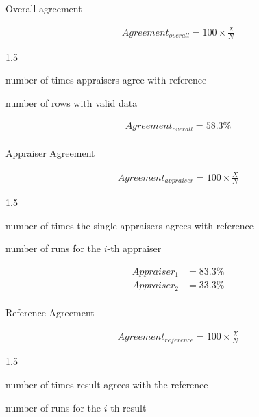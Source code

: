 \documentclass[
  a4paper,
]{scrbook}
\makeatletter
\let\oldparagraph\paragraph
\renewcommand{\paragraph}{
    \@ifstar
      \xxxParagraphStar
      \xxxParagraphNoStar
  }
\newcommand{\xxxParagraphStar}[1]{\oldparagraph*{#1}\mbox{}}
\newcommand{\xxxParagraphNoStar}[1]{\oldparagraph{#1}\mbox{}}
\providecommand{\tightlist}{%
  \setlength{\itemsep}{0pt}\setlength{\parskip}{0pt}}\usepackage{longtable,booktabs,array}
\let\olddescription\description
\let\endolddescription\enddescription
\renewenvironment{description}{
          \begin{spacing}{1.5}\olddescription
        }{
          \endolddescription\end{spacing}
        }
\makeatother
\begin{document}
\endgroup

\paragraph{Overall agreement}\label{overall-agreement}

\begin{align}
Agreement_{overall} = 100 \times \frac{X}{N}
\end{align}

\begin{description}
\tightlist
\item[\(X\)]
number of times appraisers agree with reference
\item[\(N\)]
number of rows with valid data
\end{description}

\begin{align}
Agreement_{overall} = 58.3\% \nonumber
\end{align}

\paragraph{Appraiser Agreement}\label{appraiser-agreement}

\begin{align}
Agreement_{appraiser} = 100 \times \frac{X}{N}
\end{align}

\begin{description}
\tightlist
\item[\(X\)]
number of times the single appraisers agrees with reference
\item[\(N_i\)]
number of runs for the \(i\)-th appraiser
\end{description}

\begin{align}
Appraiser_{1} &= 83.3\% \nonumber \\
Appraiser_{2} &= 33.3\% \nonumber
\end{align}

\paragraph{Reference Agreement}\label{reference-agreement}

\begin{align}
Agreement_{reference} = 100 \times \frac{X}{N}
\end{align}

\begin{description}
\tightlist
\item[\(X\)]
number of times result agrees with the reference
\item[\(N_i\)]
number of runs for the \(i\)-th result
\end{description}
\end{document}
